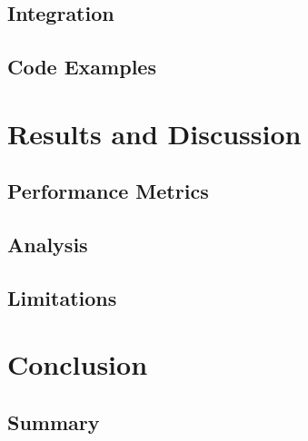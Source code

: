 \documentclass[12pt,oneside,a4paper]{article}
\begin{document}
\subsection{Integration}

\subsection{Code Examples}





\section{Results and Discussion}

\subsection{Performance Metrics}

\subsection{Analysis}

\subsection{Limitations}





\section{Conclusion}

\subsection{Summary}
\end{document}
